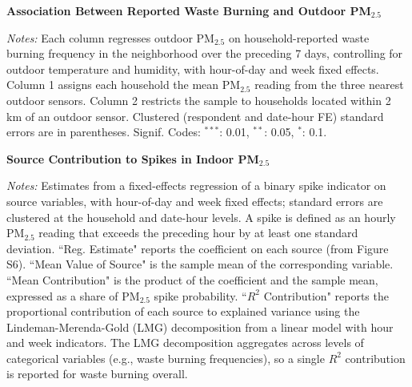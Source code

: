 \documentclass[9pt,twoside]{pnas-new}
\begin{document}
\begin{adjustwidth}{1cm}{1cm}
\newpage

\begin{table}[!h] %
    \centering

    \caption{\textbf{Association Between Reported Waste Burning and Outdoor PM$_{2.5}$}}
    \label{tab:waste}
    \begin{adjustbox}{max width=.7\textwidth}
    \small
    
    \end{adjustbox}
    \caption*{\footnotesize \textit{Notes:}  Each column regresses outdoor PM$_{2.5}$ on household-reported waste burning frequency in the neighborhood over the preceding 7 days, controlling for outdoor temperature and humidity, with hour-of-day and week fixed effects. Column 1 assigns each household the mean PM$_{2.5}$ reading from the three nearest outdoor sensors. Column 2 restricts the sample to households located within 2 km of an outdoor sensor. Clustered (respondent and date-hour FE) standard errors are in parentheses. Signif. Codes: $^{***}$: 0.01, $^{**}$: 0.05, $^{*}$: 0.1.}
\end{table}

\newpage

\begin{table}[!h] %
    \centering

    \caption{\textbf{Source Contribution to Spikes in Indoor PM$_{2.5}$}}
    \label{tab:spike_source}
    \begin{adjustbox}{max width=\textwidth}
    \small
    
    \end{adjustbox}
    \caption*{\footnotesize \textit{Notes:} Estimates  from a fixed-effects regression of a binary spike indicator on source variables, with hour-of-day and week fixed effects; standard errors are clustered at the household and date-hour levels. A spike is defined as an hourly PM$_{2.5}$ reading that exceeds the preceding hour by at least one standard deviation.  ``Reg. Estimate" reports the coefficient on each source (from Figure S6). ``Mean Value of Source" is the sample mean of the corresponding variable. ``Mean Contribution" is the product of the coefficient and the sample mean, expressed as a share of PM$_{2.5}$ spike probability. ``$R^2$ Contribution" reports the proportional contribution of each source to explained variance using the Lindeman-Merenda-Gold (LMG) decomposition from a linear model with hour and week indicators. The LMG decomposition aggregates across levels of categorical variables (e.g., waste burning frequencies), so a single $R^2$ contribution is reported for waste burning overall.}
\end{table}


\end{adjustwidth}
\end{document}
